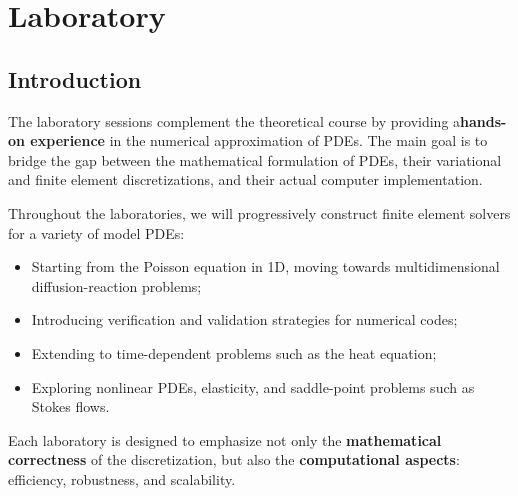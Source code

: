 \section{Laboratory}

\subsection{Introduction}

The laboratory sessions complement the theoretical course by providing a\break \textbf{hands-on experience} in the numerical approximation of PDEs. The main goal is to bridge the gap between the mathematical formulation of PDEs, their variational and finite element discretizations, and their actual computer implementation.

\highspace
Throughout the laboratories, we will progressively construct finite element solvers for a variety of model PDEs:
\begin{itemize}
    \item Starting from the Poisson equation in 1D, moving towards multidimensional diffusion-reaction problems;
    \item Introducing verification and validation strategies for numerical codes;
    \item Extending to time-dependent problems such as the heat equation;
    \item Exploring nonlinear PDEs, elasticity, and saddle-point problems such as Stokes flows.
\end{itemize}
Each laboratory is designed to emphasize not only the \textbf{mathematical correctness} of the discretization, but also the \textbf{computational aspects}: efficiency, robustness, and scalability.

